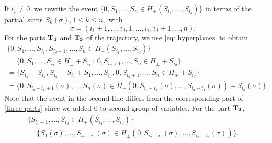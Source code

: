 \documentclass[12pt, reqno]{amsart}
\begin{document}
If $i_1 \neq 0$, we rewrite the event $\{0, S_1, \dots, S_n \in H_\pm(S_{i_1}, \dots, S_{i_d}) \}$ in terms of the partial sums $S_k(\sigma), 1 \le k \le n,$ with
$$\sigma=(i_1+1, \dots, i_d, 1, \dots, i_1, i_d+1, \dots, n).$$
For the parts ${\bf T_1}$ and ${\bf T_3}$ of the trajectory, we use \eqref{eq: hyperplanes} to obtain
\begin{multline*}
\bigl \{ 0, S_1, \dots, S_{i_1}, S_{i_d +1}, \dots, S_n \in H_\pm(S_{i_1}, \dots, S_{i_d}) \bigr \}\\
=\bigl \{ 0, S_1, \dots, S_{i_1} \in H_\pm + S_{i_1} \, ; \, 0, S_{i_d +1}, \dots, S_n \in H_\pm + S_{i_d} \bigr \} \\
= \bigl \{ S_{i_d} - S_{i_1}, S_{i_d} - S_{i_1} + S_1, \dots, S_{i_d}, 0, S_{i_d +1}, \dots, S_n  \in H_\pm + S_{i_d} \bigr \} \\
= \bigl \{ 0, S_{i_d - i_1 +1}(\sigma), \dots, S_n(\sigma) \in H_\pm(0, S_{i_2 - i_1}(\sigma), \dots, S_{i_d - i_1}(\sigma)) + S_{i_d}(\sigma) \bigr \}.
\end{multline*}
Note that the event in the second line differs from the corresponding part of \eqref{three parts} since we added $0$ to second group of variables. For the part ${\bf T_2}$, 
\begin{multline*}
\bigl \{ S_{i_1 + 1}, \dots, S_{i_d} \in H_\pm(S_{i_1}, \dots, S_{i_d})  \bigr \} \\
=  \bigl \{ S_1 (\sigma), \dots, S_{i_d - i_1}(\sigma) \in H_\pm(0, S_{i_2 - i_1}(\sigma), \dots, S_{i_d - i_1}(\sigma)) \bigr \}.
\end{multline*}
\end{document}
